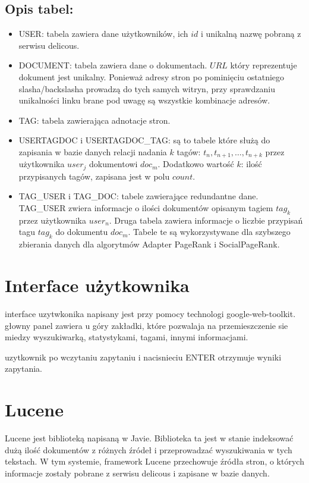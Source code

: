 \subsection*{Opis tabel:}
\begin{itemize}
	\item USER: tabela zawiera dane użytkowników, ich $id$ i unikalną nazwę pobraną z serwisu delicous.
	\item DOCUMENT: tabela zawiera dane o dokumentach. $URL$ który reprezentuje dokument jest unikalny. Ponieważ adresy stron po pominięciu ostatniego slasha/backslasha prowadzą do tych samych witryn, przy sprawdzaniu unikalności linku brane pod uwagę są wszystkie kombinacje adresów.
	\item TAG: tabela zawierająca adnotacje stron.
	\item USERTAGDOC i USERTAGDOC\_TAG: są to tabele które służą do zapisania w bazie danych relacji nadania $k$ tagów: $t_n, t_{n+1}, \dots, t_{n+k}$ przez użytkownika $user_j$  dokumentowi $doc_m$. Dodatkowo wartość $k$: ilość przypisanych tagów, zapisana jest w polu $count$.
	\item TAG\_USER i TAG\_DOC: tabele zawierające redundantne dane. TAG\_USER zwiera informacje o ilości dokumentów opisanym tagiem $tag_k$ przez użytkownika $user_n$. Druga tabela zawiera informacje o liczbie przypisań tagu $tag_k$ do dokumentu $doc_m$. Tabele te są wykorzystywane dla szybszego zbierania danych dla algorytmów Adapter PageRank i SocialPageRank.
\end{itemize}





\section{Interface użytkownika}
interface uzytwkonika napisany jest przy pomocy technologi google-web-toolkit.
głowny panel zawiera u góry zakładki, które pozwalaja na przemieszczenie sie miedzy wyszukiwarką, statystykami, tagami, innymi informacjami.

uzytkownik po wczytaniu zapytaniu i nacisnieciu ENTER otrzymuje wyniki zapytania.

\section{Lucene}

Lucene jest biblioteką napisaną w Javie. Biblioteka ta jest w stanie indeksować dużą ilość dokumentów z różnych źródeł i przeprowadzać wyszukiwania w tych tekstach. W tym systemie, framework Lucene przechowuje źródła stron, o których informacje zostały pobrane z serwisu delicous i zapisane w bazie danych. 

